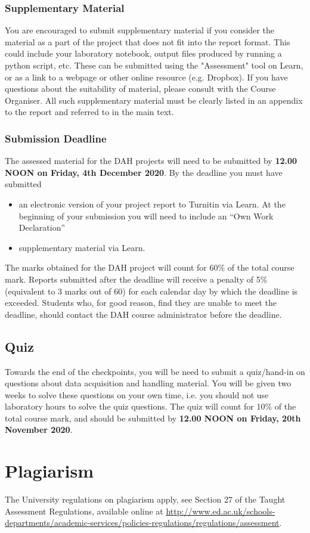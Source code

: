 \subsubsection{Supplementary Material}

You are encouraged to submit supplementary material if you consider the material as a part of the project that does not fit into the report format. 
This could include your laboratory notebook, output files produced by running a python script, etc.
These can be submitted using the "Assessment" tool on Learn, or as a link to a webpage or other online resource (e.g. Dropbox).
If you have questions about the suitability of material, please consult with the Course Organiser.
All such supplementary material must be clearly listed in an appendix to the report and referred to in the main text. 

\newpage
\subsubsection{Submission Deadline}

The assessed material for the DAH projects will need to be submitted by {\bf 12.00 NOON on Friday, 4th December 2020}. By the deadline you must have submitted 
\begin{itemize}
\item an electronic version of your project report to Turnitin via Learn. At the beginning of your submission you will need to include an ``Own Work Declaration''
\item supplementary material via Learn. %
\end{itemize}
The marks obtained for the DAH project will count for 60\% of the total course mark. 
Reports submitted after the deadline will receive a penalty of 5\% (equivalent to 3 marks out of 60) for each calendar day by which the deadline is exceeded.
Students who, for good reason, find they are unable to meet the deadline, should contact the DAH course administrator before the deadline.

\subsection{Quiz}

Towards the end of the checkpoints, you will be need to submit a quiz/hand-in on questions about data acquisition and handling material.
You will be given two weeks to solve these questions on your own time, i.e. you should not use laboratory hours to solve the quiz questions.
The quiz will count for 10\% of the total course mark, and should be submitted by {\bf 12.00 NOON on Friday, 20th November 2020}.

\section{Plagiarism}

The University regulations on plagiarism apply, see Section 27 of the Taught Assessment Regulations, available online at \url{http://www.ed.ac.uk/schools-departments/academic-services/policies-regulations/regulations/assessment}.
